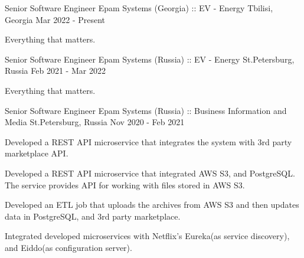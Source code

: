

\begin{cventries}

  \cventry
    {Senior Software Engineer} %
    {Epam Systems (Georgia) :: EV - Energy} %
    {Tbilisi, Georgia} %
    {Mar 2022 - Present} %
    {
      \begin{cvitems} %
        \item {Everything that matters.}
      \end{cvitems}
    }
\cventry
{Senior Software Engineer} %
{Epam Systems (Russia) ::  EV - Energy} %
{St.Petersburg, Russia} %
{Feb 2021 - Mar 2022} %
{
  \begin{cvitems} %
    \item {Everything that matters.}
  \end{cvitems}
}
\cventry
{Senior Software Engineer} %
{Epam Systems (Russia) ::  Business Information and Media} %
{St.Petersburg, Russia} %
{Nov 2020 - Feb 2021} %
{
  \begin{cvitems} %
    \item {Developed a REST API microservice that integrates the system with 3rd party marketplace API.}
    \item {Developed a REST API microservice that integrated AWS S3, and PostgreSQL. The service provides API for working with files stored in AWS S3.}
    \item {Developed an ETL job that uploads the archives from AWS S3 and then updates data in PostgreSQL, and 3rd party marketplace.}
    \item {Integrated developed microservices with Netflix's Eureka(as service discovery), and Eiddo(as configuration server).}
  \end{cvitems}
}


\end{cventries}
